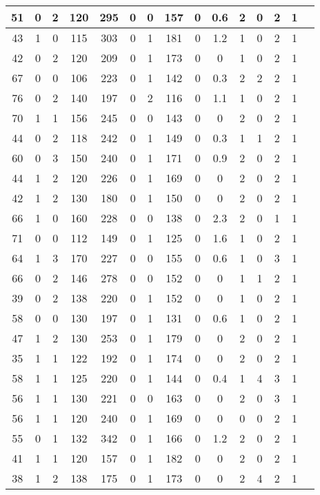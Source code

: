 \documentclass{article}
\begin{document}
\begin{longtable}{
|
c|c|c|c|c|c|c|c|c|c|c|c|c|c|c|}
\hline
51 & 0 & 2 & 120 & 295 & 0 & 0 & 157 & 0 & 0.6 & 2 & 0 & 2 & 1 \\
\hline
43 & 1 & 0 & 115 & 303 & 0 & 1 & 181 & 0 & 1.2 & 1 & 0 & 2 & 1 \\
\hline
42 & 0 & 2 & 120 & 209 & 0 & 1 & 173 & 0 & 0 & 1 & 0 & 2 & 1 \\
\hline
67 & 0 & 0 & 106 & 223 & 0 & 1 & 142 & 0 & 0.3 & 2 & 2 & 2 & 1 \\
\hline
76 & 0 & 2 & 140 & 197 & 0 & 2 & 116 & 0 & 1.1 & 1 & 0 & 2 & 1 \\
\hline
70 & 1 & 1 & 156 & 245 & 0 & 0 & 143 & 0 & 0 & 2 & 0 & 2 & 1 \\
\hline
44 & 0 & 2 & 118 & 242 & 0 & 1 & 149 & 0 & 0.3 & 1 & 1 & 2 & 1 \\
\hline
60 & 0 & 3 & 150 & 240 & 0 & 1 & 171 & 0 & 0.9 & 2 & 0 & 2 & 1 \\
\hline
44 & 1 & 2 & 120 & 226 & 0 & 1 & 169 & 0 & 0 & 2 & 0 & 2 & 1 \\
\hline
42 & 1 & 2 & 130 & 180 & 0 & 1 & 150 & 0 & 0 & 2 & 0 & 2 & 1 \\
\hline
66 & 1 & 0 & 160 & 228 & 0 & 0 & 138 & 0 & 2.3 & 2 & 0 & 1 & 1 \\
\hline
71 & 0 & 0 & 112 & 149 & 0 & 1 & 125 & 0 & 1.6 & 1 & 0 & 2 & 1 \\
\hline
64 & 1 & 3 & 170 & 227 & 0 & 0 & 155 & 0 & 0.6 & 1 & 0 & 3 & 1 \\
\hline
66 & 0 & 2 & 146 & 278 & 0 & 0 & 152 & 0 & 0 & 1 & 1 & 2 & 1 \\
\hline
39 & 0 & 2 & 138 & 220 & 0 & 1 & 152 & 0 & 0 & 1 & 0 & 2 & 1 \\
\hline
58 & 0 & 0 & 130 & 197 & 0 & 1 & 131 & 0 & 0.6 & 1 & 0 & 2 & 1 \\
\hline
47 & 1 & 2 & 130 & 253 & 0 & 1 & 179 & 0 & 0 & 2 & 0 & 2 & 1 \\
\hline
35 & 1 & 1 & 122 & 192 & 0 & 1 & 174 & 0 & 0 & 2 & 0 & 2 & 1 \\
\hline
58 & 1 & 1 & 125 & 220 & 0 & 1 & 144 & 0 & 0.4 & 1 & 4 & 3 & 1 \\
\hline
56 & 1 & 1 & 130 & 221 & 0 & 0 & 163 & 0 & 0 & 2 & 0 & 3 & 1 \\
\hline
56 & 1 & 1 & 120 & 240 & 0 & 1 & 169 & 0 & 0 & 0 & 0 & 2 & 1 \\
\hline
55 & 0 & 1 & 132 & 342 & 0 & 1 & 166 & 0 & 1.2 & 2 & 0 & 2 & 1 \\
\hline
41 & 1 & 1 & 120 & 157 & 0 & 1 & 182 & 0 & 0 & 2 & 0 & 2 & 1 \\
\hline
38 & 1 & 2 & 138 & 175 & 0 & 1 & 173 & 0 & 0 & 2 & 4 & 2 & 1 \\

\end{longtable}
\end{document}
